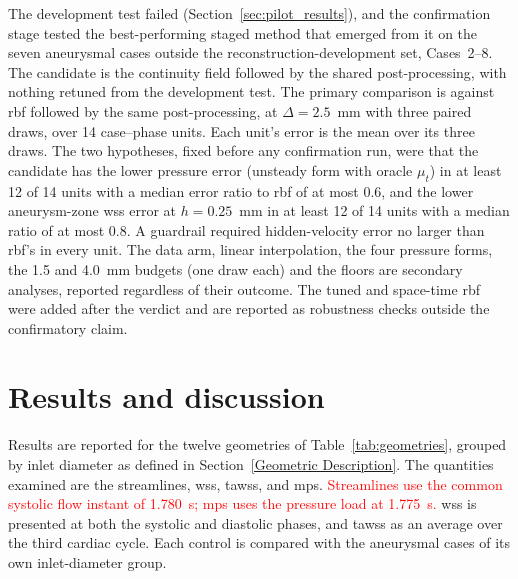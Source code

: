 \documentclass[12pt,a4paper]{article}
\newcommand{\cfdrevision}[1]{\textcolor{red}{#1}}
\newcommand{\WSS}{\ac{wss}\xspace}
\newcommand{\TAWSS}{\ac{tawss}\xspace}
\newcommand{\MPS}{\ac{mps}\xspace}
\newcommand{\RBF}{\ac{rbf}\xspace}
\theoremstyle{definition}
\numberwithin{equation}{section}
\begin{document}
The development test failed (Section~\ref{sec:pilot_results}), and the confirmation stage tested the best-performing staged method that emerged from it on the seven aneurysmal cases outside the reconstruction-development set, Cases~2--8. The candidate is the continuity field followed by the shared post-processing, with nothing retuned from the development test. The primary comparison is against \RBF followed by the same post-processing, at $\Delta=2.5$~mm with three paired draws, over 14 case--phase units. Each unit's error is the mean over its three draws. The two hypotheses, fixed before any confirmation run, were that the candidate has the lower pressure error (unsteady form with oracle $\mu_t$) in at least 12 of 14 units with a median error ratio to \RBF of at most 0.6, and the lower aneurysm-zone \WSS error at $h=0.25$~mm in at least 12 of 14 units with a median ratio of at most 0.8. A guardrail required hidden-velocity error no larger than \RBF's in every unit. The data arm, linear interpolation, the four pressure forms, the 1.5 and 4.0~mm budgets (one draw each) and the floors are secondary analyses, reported regardless of their outcome. The tuned and space-time \RBF were added after the verdict and are reported as robustness checks outside the confirmatory claim.

\section{\label{Results and Discussions}Results and discussion}
\label{sec:cfd_results}
Results are reported for the twelve geometries of Table~\ref{tab:geometries},
grouped by inlet diameter as defined in Section~\ref{Geometric Description}. The
quantities examined are the streamlines, \WSS, \TAWSS, and \MPS. \cfdrevision{Streamlines use the common systolic flow instant of 1.780~s; \MPS uses the pressure load at 1.775~s.} \WSS is presented at both
the systolic and diastolic phases, and \TAWSS as an average over the third
cardiac cycle. Each control is compared with the aneurysmal cases of its own
inlet-diameter group.
\end{document}
